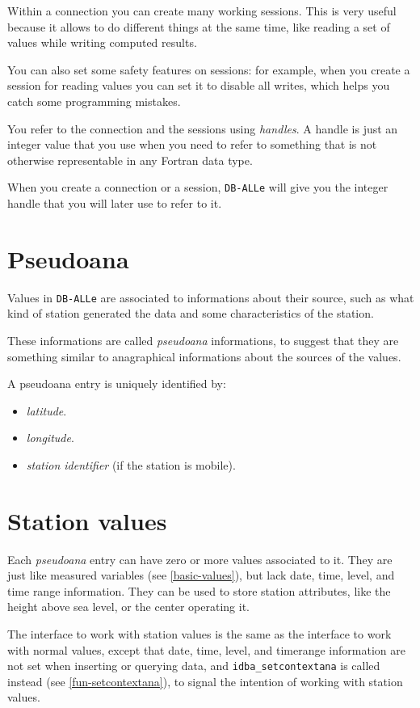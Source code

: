 \documentclass[final,12pt,a4paper,twoside]{book}
\newcommand{\dballe}{{\tt DB-ALLe}}
\begin{document}
Within a connection you can create many working sessions.  This is very useful
because it allows to do different things at the same time, like reading a set
of values while writing computed results.

You can also set some safety features on sessions: for example, when you create
a session for reading values you can set it to disable all writes, which helps
you catch some programming mistakes.

You refer to the connection and the sessions using \emph{handles}.  A handle is
just an integer value that you use when you need to refer to something that is
not otherwise representable in any Fortran data type.

When you create a connection or a session, \dballe{} will give you the integer
handle that you will later use to refer to it.

\section {Pseudoana}

Values in \dballe{} are associated to informations about their source, such as
what kind of station generated the data and some characteristics of the station.

These informations are called \emph{pseudoana} informations, to suggest that
they are something similar to anagraphical informations about the sources of
the values.

A pseudoana entry is uniquely identified by:

\begin{itemize}
\item \emph{latitude}.
\item \emph{longitude}.
\item \emph{station identifier} (if the station is mobile).
\end{itemize}

\section {Station values}

Each \emph{pseudoana} entry can have zero or more values associated to it. They
are just like measured variables (see \ref{basic-values}), but lack date, time,
level, and time range information. They can be used to store station
attributes, like the height above sea level, or the center operating it.

The interface to work with station values is the same as the interface to work
with normal values, except that date, time, level, and timerange information
are not set when inserting or querying data, and \texttt{idba\_setcontextana}
is called instead (see \ref{fun-setcontextana}), to signal the intention of
working with station values.
\end{document}
